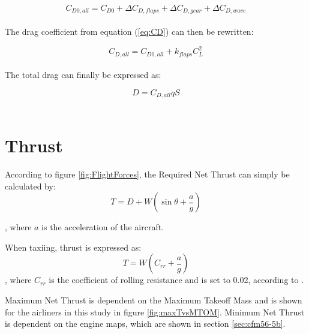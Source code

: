 \documentclass[english]{kththesis}
\begin{document}
\begin{equation}
\label{eq:CD0all}
C_{D0,all} = C_{D0} + \Delta C_{D,flaps} + \Delta C_{D,gear} + \Delta C_{D,wave}
\end{equation}\\

The drag coefficient from equation (\ref{eq:CD}) can then be rewritten:

\begin{equation}
\label{eq:CDall}
C_{D,all} = C_{D0,all} + k_{flaps} C_{L}^2
\end{equation}\\

The total drag can finally be expressed as:

\begin{equation}
\label{eq:Dall}
D = C_{D,all} q S
\end{equation}\\



\section{Thrust}
\label{sec:thrust}
According to figure \ref{fig:FlightForces}, the Required Net Thrust can simply be calculated by:
\begin{equation}
\label{eq:ThrustFly}
T = D + W \left( \sin \theta + \frac{a}{g} \right)
\end{equation}

, where $a$ is the acceleration of the aircraft.

When taxiing, thrust is expressed as:
\begin{equation}
\label{eq:ThrustTaxi}
T = W \left( C_{rr} + \frac{a}{g} \right)
\end{equation}
, where $C_{rr}$ is the coefficient of rolling resistance and is set to 0.02, according to \cite{EngTool2008}.

Maximum Net Thrust is dependent on the Maximum Takeoff Mass and is shown for the airliners in this study in figure \ref{fig:maxTvsMTOM}.
Minimum Net Thrust is dependent on the engine maps, which are shown in section \ref{sec:cfm56-5b}.
\end{document}

